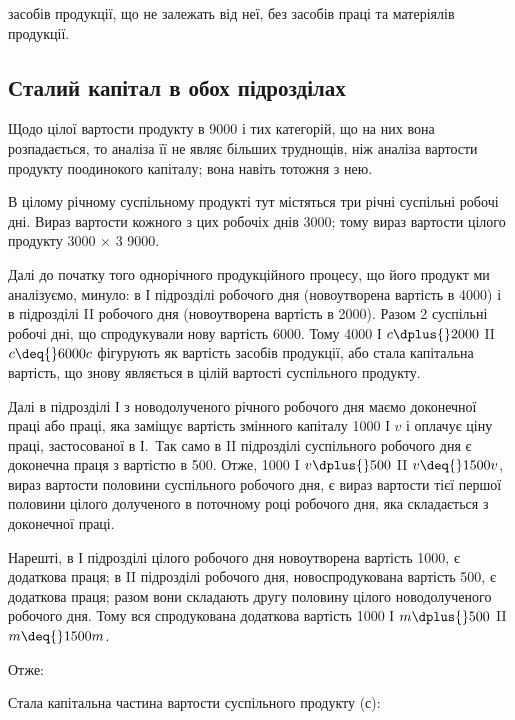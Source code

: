 \parcont{}  %
засобів продукції, що не залежать від неї, без засобів праці та матеріялів
продукції.

\subsection{Сталий капітал в обох підрозділах}

Щодо цілої вартости продукту в 9000 і тих категорій, що на них
вона розпадається, то аналіза її не являє більших труднощів, ніж аналіза
вартости продукту поодинокого капіталу; вона навіть тотожня з нею.

В цілому річному суспільному продукті тут містяться три річні суспільні
робочі дні. Вираз вартости кожного з цих робочіх днів \deq{} 3000; тому
вираз вартости цілого продукту 3000 × 3 \deq{} 9000.

Далі до початку того однорічного продукційного процесу, що його
продукт ми аналізуємо, минуло: в І підрозділі  робочого дня (новоутворена
вартість в 4000) і в підрозділі II  робочого дня (новоутворена
вартість в 2000). Разом 2 суспільні робочі дні, що спродукували
нову вартість \deq{} 6000. Тому 4000 І $c \dplus{} 2000$ II $c \deq{} 6000 c$ фігурують
як вартість засобів продукції, або стала капітальна вартість, що
знову являється в цілій вартості суспільного продукту.

Далі в підрозділі І з новодолученого річного робочого дня маємо 
доконечної праці або праці, яка заміщує вартість змінного капіталу 1000
І $v$ і оплачує ціну праці, застосованої в І.~Так само в II підрозділі  суспільного
робочого дня є доконечна праця з вартістю в 500. Отже, 1000
I $v \dplus{} 500$ II $v \deq{} 1500 v$, вираз вартости половини суспільного робочого
дня, є вираз вартости тієї першої половини цілого долученого в поточному
році робочого дня, яка складається з доконечної праці.

Нарешті, в І підрозділі  цілого робочого дня новоутворена вартість \deq{}
1000, є додаткова праця; в II підрозділі  робочого дня, новоспродукована
вартість \deq{} 500, є додаткова праця; разом вони складають другу
половину цілого новодолученого робочого дня. Тому вся спродукована
додаткова вартість \deq{} 1000 І $m \dplus{} 500$ II $m \deq{} 1500 m$.

Отже:

Стала капітальна частина вартости суспільного продукту (с):

